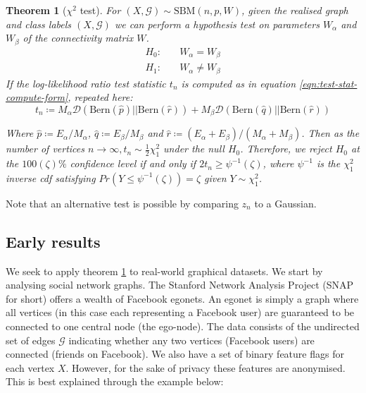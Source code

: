 \documentclass[11pt]{article}
\newcommand{\Gcal}{\mathcal{G}}
\newcommand{\kl}{\mathcal{D}}
\newtheorem{theorem}{Theorem}[section]
\begin{document}
\begin{multicols*}{2}
\begin{theorem}[$\chi^2$ test]
	For $(X, \Gcal) \sim \textrm{SBM}(n, p, W)$, given the realised graph and class labels $(X, \Gcal)$ we can perform a hypothesis test on parameters $W_\alpha$ and $W_\beta$ of the connectivity matrix $W$.
	\begin{align*}
	H_0:& \quad W_{\alpha} = W_{\beta} \\
	H_1:& \quad W_{\alpha} \neq W_{\beta}
	\end{align*}
	If the log-likelihood ratio test statistic $t_n$ is computed as in equation \ref{eqn:test-stat-compute-form}, repeated here:
	\begin{equation*}
		t_n \coloneqq  M_\alpha \kl\left( \textrm{Bern}(\hat{p}) || \textrm{Bern}(\hat{r})\right) + 
		M_\beta \kl\left( \textrm{Bern}(\hat{q}) || \textrm{Bern}(\hat{r})\right)
	\end{equation*}
	
	Where $\hat{p} \coloneqq E_\alpha / M_\alpha$, $\hat{q} \coloneqq E_\beta / M_\beta$ and $\hat{r} \coloneqq (E_\alpha + E_\beta) / (M_\alpha + M_\beta)$. Then as the number of vertices $n \rightarrow \infty, t_n \sim \frac{1}{2} \chi^2_1$ under the null $H_0$. Therefore, we reject $H_0$ at the $100(\zeta)\%$ confidence level if and only if $2t_n \geq \psi^{-1}(\zeta)$, where $\psi^{-1}$ is the $\chi^2_1$ inverse cdf satisfying $Pr(Y \leq \psi^{-1}(\zeta)) = \zeta$ given $Y \sim \chi^2_1$.
	
	\label{theorem:hyp-test-sbm-chi}
\end{theorem}

Note that an alternative test is possible by comparing $z_n$ to a Gaussian.

\subsection{Early results}

We seek to apply theorem \ref{theorem:hyp-test-sbm-chi} to real-world graphical datasets. We start by analysing social network graphs. The Stanford Network Analysis Project (SNAP for short) \cite{snapnets} offers a wealth of Facebook egonets. An egonet is simply a graph where all vertices (in this case each representing a Facebook user) are guaranteed to be connected to one central node (the ego-node). The data consists of the undirected set of edges $\Gcal$ indicating whether any two vertices (Facebook users) are connected (friends on Facebook). We also have a set of binary feature flags for each vertex $X$. However, for the sake of privacy these features are anonymised. This is best explained through the example below: \\


\end{multicols*}
\end{document}
